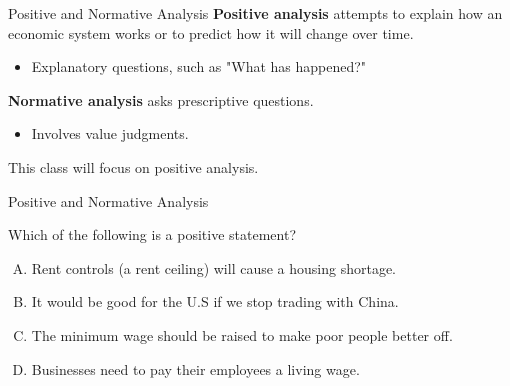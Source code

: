 \documentclass[12pt,t]{beamer}
\begin{document}
\begin{frame}{Positive and Normative Analysis}
  \textbf{Positive analysis} attempts to explain how an economic system works or to predict how it will change over time.

  \begin{itemize}
    \item Explanatory questions, such as "What has happened?"
  \end{itemize}

  \bigskip
  \textbf{Normative analysis} asks prescriptive questions.

  \begin{itemize}
    \item Involves value judgments.
  \end{itemize}

  \bigskip
  \begin{center}
  This class will focus on positive analysis.
  \end{center}
\end{frame}

\begin{frame}{Positive and Normative Analysis}
  
  Which of the following is a positive statement?

  \bigskip
  \begin{enumerate}[A)]
    \item Rent controls (a rent ceiling) will cause a housing shortage.
    \item It would be good for the U.S if we stop trading with China.
    \item The minimum wage should be raised to make poor people better off.
    \item Businesses need to pay their employees a living wage.
  \end{enumerate}
\end{frame}
\end{document}
